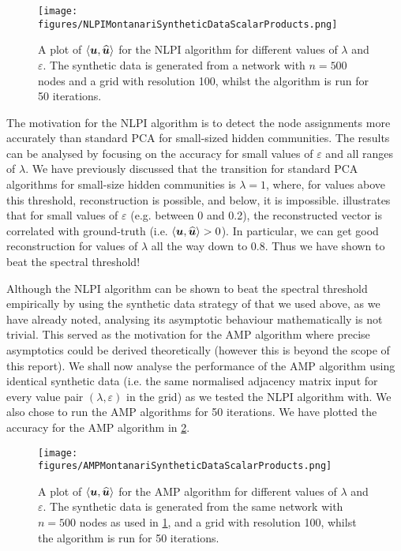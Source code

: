 \begin{figure}
	\centering
	\texttt{[image: figures/NLPIMontanariSyntheticDataScalarProducts.png]}
	\caption[Plot of accuracy for NLPI algorithm.]{\label{fig:NLPIAccuracyPlot} A plot of $\innerP{\vecvar{u},\widehat{\vecvar{u}}}$ for the NLPI algorithm for different values of $\lambda$ and $\varepsilon$. The synthetic data is generated from a network with $n=500$ nodes and a grid with resolution 100, whilst the algorithm is run for 50 iterations.}
\end{figure}

The motivation for the NLPI algorithm is to detect the node assignments more accurately than standard PCA for small-sized hidden communities. The results can be analysed by focusing on the accuracy for small values of $\varepsilon$ and all ranges of $\lambda$.
We have previously discussed that the transition for standard PCA algorithms for small-size hidden communities is $\lambda = 1$, where, for values above this threshold, reconstruction is possible, and below, it is impossible.
 illustrates that for small values of $\varepsilon$ (e.g. between 0 and 0.2), the reconstructed vector is correlated with ground-truth (i.e. $\innerP{\vecvar{u},\widehat{\vecvar{u}}} > 0$).
In particular, we can get good reconstruction for values of $\lambda$ all the way down to 0.8. Thus we have shown to beat the spectral threshold!

Although the NLPI algorithm can be shown to beat the spectral threshold empirically by using the synthetic data strategy of \cite{Mon13}  that we used above, as we have already noted, analysing its asymptotic behaviour mathematically is not trivial.
This served as the motivation for the AMP algorithm where precise asymptotics could be derived theoretically (however this is beyond the scope of this report).
We shall now analyse the performance of the AMP algorithm using identical synthetic data (i.e. the same normalised adjacency matrix input for every value pair $(\lambda,\varepsilon)$ in the grid) as we tested the NLPI algorithm with. We also chose to run the AMP algorithms for 50 iterations.
We have plotted the accuracy for the AMP algorithm in \cref{fig:AMPAccuracyPlot}.


\begin{figure}
	\centering
	\texttt{[image: figures/AMPMontanariSyntheticDataScalarProducts.png]}
	\caption[Plot of accuracy for AMP algorithm.]{\label{fig:AMPAccuracyPlot} A plot of $\innerP{\vecvar{u},\widehat{\vecvar{u}}}$ for the AMP algorithm for different values of $\lambda$ and $\varepsilon$. The synthetic data is generated from the same network with $n=500$ nodes as used in \cref{fig:NLPIAccuracyPlot}, and a grid with resolution 100, whilst the algorithm is run for 50 iterations.}
\end{figure}

